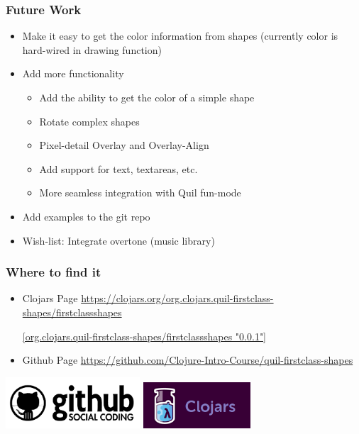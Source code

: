 \documentclass{beamer}
\begin{document}
\begin{frame}
	\frametitle{Future Work}
	\begin{itemize}
		\item Make it easy to get the color information from shapes (currently color is hard-wired in drawing function) 
		\item Add more functionality
		\begin{itemize}
			\item Add the ability to get the color of a simple shape
			\item Rotate complex shapes
			\item Pixel-detail Overlay and Overlay-Align
			\item Add support for text, textareas, etc.  
			\item More seamless integration with Quil fun-mode
		\end{itemize}
		\item Add examples to the git repo 
		\item Wish-list: Integrate overtone (music library)
	\end{itemize}
\end{frame}

\begin{frame}
	\frametitle{Where to find it}
	\begin{itemize}
	\item Clojars Page
	\href{https://clojars.org/org.clojars.quil-firstclass-shapes/firstclassshapes}{https://clojars.org/org.clojars.quil-firstclass-shapes/firstclassshapes}
	
	\href{https://clojars.org/org.clojars.quil-firstclass-shapes/firstclassshapes} {[org.clojars.quil-firstclass-shapes/firstclassshapes "0.0.1"]}
	
	\item Github Page
	\href{https://github.com/Clojure-Intro-Course/quil-firstclass-shapes}{https://github.com/Clojure-Intro-Course/quil-firstclass-shapes}
	\end{itemize}
	\includegraphics[width=5cm]{PresentationImages/github.png}
	\hspace{1cm}
	\includegraphics[width=4cm]{PresentationImages/clojars.png}
\end{frame}
\end{document}
